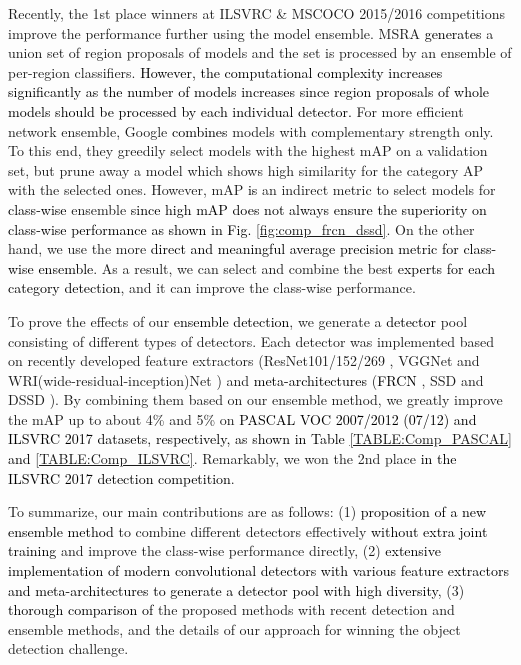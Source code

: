 \documentclass[10pt,twocolumn,letterpaper]{article}
\newcommand{\RE}{\textcolor{black}}
\newcommand{\RV}{\textcolor{black}}
\begin{document}
Recently, the 1st place winners at ILSVRC \cite{ILSVRC15} \& MSCOCO \cite{LinMBHPRDZ_corr14} 2015/2016 competitions improve the  performance further using the model ensemble. MSRA \cite{HeZRS_CVPR16} \RV{generates} a union set of region proposals of models and the set is processed by an ensemble of per-region classifiers. \RV{However, the computational complexity increases significantly as the number of models increases since region proposals of whole models should be processed by each individual detector.} For more efficient network ensemble,  Google \cite{HuangRSZKFFWSG_Corr16} \RV{combines} models with complementary strength only. To this end, they greedily select models with the highest mAP on a validation set, but prune away a model which shows high similarity for the category AP with the selected ones. However, mAP \RV{is} an indirect metric to select models for \RV{class-wise} ensemble \RV{since high mAP does not always ensure the superiority on class-wise performance as shown in Fig. \ref{fig:comp_frcn_dssd}}.
On the other hand,  we use the more  \RE{direct and meaningful average precision  metric for class-wise ensemble}. As a result, we can select and combine the best \RE{experts for each category detection}, and it can improve the class-wise performance. 





To prove the effects of our \RE{ensemble detection}, we generate a \RV{detector} pool consisting of different types of detectors. Each detector was implemented based on recently developed feature extractors (ResNet101/152/269 \cite{HeZRS_CVPR16}, VGGNet \cite{SimonyanZ14a} and WRI(wide-residual-inception)Net \cite{LeeKPCK_Corr17}) and \RE{meta-architectures} (\RE{FRCN} \cite{RenHGS15_NIPS15}, SSD \cite{LiuAESRFB_ECCV16} and DSSD \cite{FuLRTB_Corr17}). By combining them based on our ensemble method, we greatly improve the mAP up to about 4\% and 5\% on \RE{PASCAL VOC 2007/2012 (07/12)  and ILSVRC 2017 datasets, respectively, as \RV{shown} in Table \ref{TABLE:Comp_PASCAL} and \ref{TABLE:Comp_ILSVRC}}. Remarkably, we won the 2nd place \RV{in the ILSVRC 2017  detection competition}.



To summarize, our main contributions are as follows: (1) \RE{proposition of} \RV{a new ensemble method} to combine different detectors effectively \RE{without extra joint training} and improve the class-wise performance directly, (2) \RV{extensive implementation of modern convolutional detectors with \RV{various} feature extractors and meta-architectures to generate a detector pool with high diversity}, (3) \RE{thorough comparison of} the proposed methods with recent detection and ensemble methods, and the details of our approach for winning the object detection challenge. 
\end{document}
